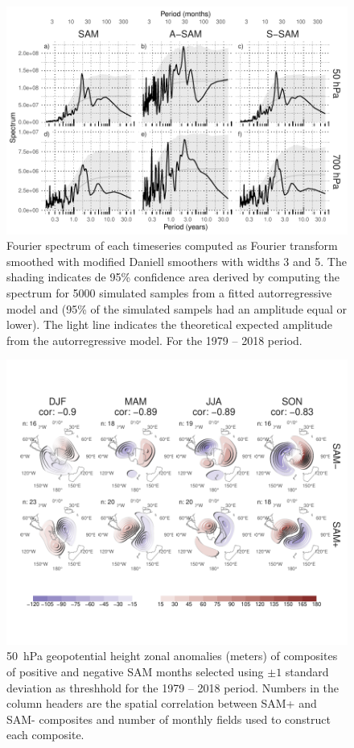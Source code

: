 \documentclass[smallextended]{svjour3}       %
\begin{document}
\begin{figure}
\includegraphics{A2-1} \caption{Fourier spectrum of each timeseries computed as Fourier transform smoothed with modified Daniell smoothers with widths 3 and 5. The shading indicates de 95\% confidence area derived by computing the spectrum for 5000 simulated samples from a fitted autorregressive model and (95\% of the simulated sampels had an amplitude equal or lower). The light line indicates the theoretical expected amplitude from the autorregressive model. For the 1979 -- 2018 period.}\label{fig:A2}
\end{figure}

\begin{figure}
\includegraphics{A3-1} \caption{50~hPa geopotential height zonal anomalies (meters) of composites of positive and negative SAM months selected using $\pm1$ standard deviation as threshhold for the 1979 -- 2018 period. Numbers in the column headers are the spatial correlation between SAM+ and SAM- composites and number of monthly fields used to construct each composite.}\label{fig:A3}
\end{figure}
\end{document}
